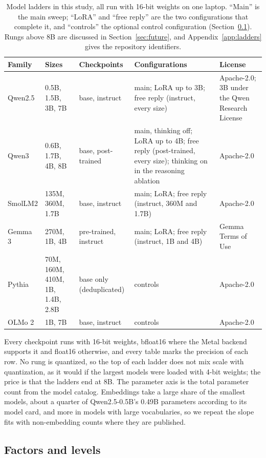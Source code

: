 \begin{table}[t]
\centering\small
\caption{Model ladders in this study, all run with 16-bit weights on one laptop. ``Main'' is the main sweep; ``LoRA'' and ``free reply'' are the two configurations that complete it, and ``controls'' the optional control configuration (Section~\ref{sec:setup:factors}). Rungs above 8B are discussed in Section~\ref{sec:future}, and Appendix~\ref{app:ladders} gives the repository identifiers.}
\label{tab:ladders}
\begin{tabularx}{\linewidth}{@{}l X l X X@{}}
\toprule
Family & Sizes & Checkpoints & Configurations & License\\
\midrule
Qwen2.5 & 0.5B, 1.5B, 3B, 7B & base, instruct & main; LoRA up to 3B; free reply (instruct, every size) & Apache-2.0; 3B under the Qwen Research License\\
Qwen3 & 0.6B, 1.7B, 4B, 8B & base, post-trained & main, thinking off; LoRA up to 4B; free reply (post-trained, every size); thinking on in the reasoning ablation & Apache-2.0\\
SmolLM2 & 135M, 360M, 1.7B & base, instruct & main; LoRA; free reply (instruct, 360M and 1.7B) & Apache-2.0\\
Gemma 3 & 270M, 1B, 4B & pre-trained, instruct & main; LoRA; free reply (instruct, 1B and 4B) & Gemma Terms of Use\\
Pythia & 70M, 160M, 410M, 1B, 1.4B, 2.8B & base only (deduplicated) & controls & Apache-2.0\\
OLMo 2 & 1B, 7B & base, instruct & controls & Apache-2.0\\
\bottomrule
\end{tabularx}
\end{table}

Every checkpoint runs with 16-bit weights, bfloat16 where the Metal backend supports it and float16 otherwise, and every table marks the precision of each row. No rung is quantized, so the top of each ladder does not mix scale with quantization, as it would if the largest models were loaded with 4-bit weights; the price is that the ladders end at 8B. The parameter axis is the total parameter count from the model catalog. Embeddings take a large share of the smallest models, about a quarter of Qwen2.5-0.5B's 0.49B parameters according to its model card, and more in models with large vocabularies, so we repeat the slope fits with non-embedding counts where they are published.

\subsection{Factors and levels}
\label{sec:setup:factors}

